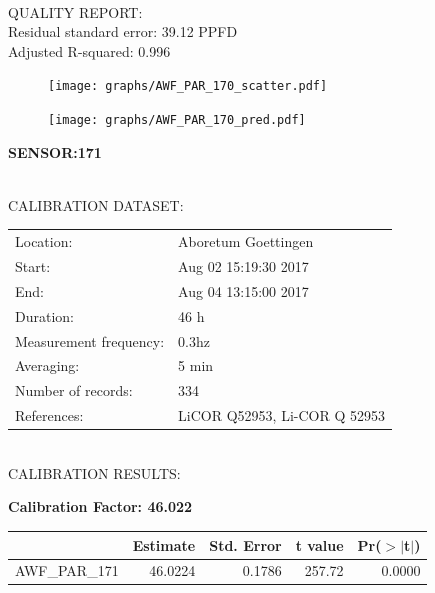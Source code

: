 \documentclass[oneside]{report}
\begin{document}
\hrulefill\\
QUALITY REPORT:\\
Residual standard error: 39.12 PPFD\\
Adjusted R-squared: 0.996



\begin{figure}[H]
  \centering
  \texttt{[image: graphs/AWF\_PAR\_170\_scatter.pdf]}
\end{figure}




\begin{figure}[H]
  \centering
  \texttt{[image: graphs/AWF\_PAR\_170\_pred.pdf]}
\end{figure}

\pagebreak


\begin{center}
\large{\textbf{SENSOR:171}}\\
\end{center}

\hrulefill\\
CALIBRATION DATASET:\\
\begin{table}[h!]
  \centering
  \label{tab:table1}
  \begin{tabular}{ll}
    Location: & Aboretum Goettingen\\ 
    
    
    Start:  & Aug 02 15:19:30 2017 \\
    End:   & Aug 04 13:15:00 2017\\ 
    Duration: & 46 h\\
    Measurement frequency: & 0.3hz\\
    Averaging:  &5 min\\
    Number of records: & 334 \\
    References: & LiCOR Q52953, Li-COR Q 52953 \\
  \end{tabular}
\end{table}

\hrulefill\\
CALIBRATION RESULTS:\\


\begin{center}
\textbf{\large{Calibration Factor: 46.022}}\\
\end{center}
\begin{table}[ht]
\centering
\begin{tabular}{rrrrr}
  \hline
 & Estimate & Std. Error & t value & Pr($>$$|$t$|$) \\ 
  \hline
AWF\_PAR\_171 & 46.0224 & 0.1786 & 257.72 & 0.0000 \\ 
   \hline
\end{tabular}
\end{table}
\end{document}
